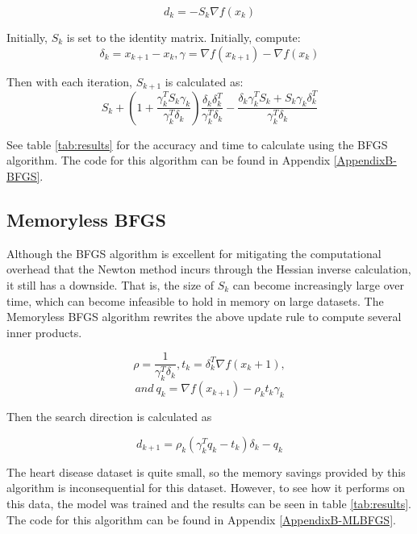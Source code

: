 \documentclass[12pt,conference]{IEEEtran}
\begin{document}
$$ d_k = -S_k \nabla f(x_k) $$

Initially, $S_k$ is set to the identity matrix. Initially, compute:
$$ \delta_k = x_{k+1} - x_{k}, \gamma = \nabla f(x_{k+1}) - \nabla f(x_k) $$

Then with each iteration, $S_{k+1}$ is calculated as:
$$ S_k + \left( 1 + \frac{\gamma_k^T S_k \gamma_k}{\gamma_k^T \delta_k} \right) \frac{\delta_k \delta_k^T}{\gamma_k^T\delta_k} - \frac{\delta_k \gamma_k^T S_k + S_k \gamma_k \delta_k^T}{\gamma_k^T\delta_k} $$

See table \ref{tab:results} for the accuracy and time to calculate using the BFGS algorithm. The code for this algorithm can be found in Appendix \ref{AppendixB-BFGS}.

\subsection {Memoryless BFGS}
Although the BFGS algorithm is excellent for mitigating the computational overhead that the Newton method incurs through the Hessian inverse calculation, it still has a downside. That is, the size of $S_k$ can become increasingly large over time, which can become infeasible to hold in memory on large datasets. The Memoryless BFGS algorithm rewrites the above update rule to compute several inner products.

$$ \rho = \frac{1}{\gamma^T_k \delta_k}, t_k = \delta_k^T \nabla f(x_k+1),$$
$$and\ q_k = \nabla f(x_{k+1}) - \rho_kt_k\gamma_k$$

Then the search direction is calculated as

$$ d_{k+1} = \rho_k (\gamma_k^T q_k - t_k ) \delta_k - q_k $$

The heart disease dataset is quite small, so the memory savings provided by this algorithm is inconsequential for this dataset. However, to see how it performs on this data, the model was trained and the results can be seen in table \ref{tab:results}. The code for this algorithm can be found in Appendix \ref{AppendixB-MLBFGS}.
\end{document}
